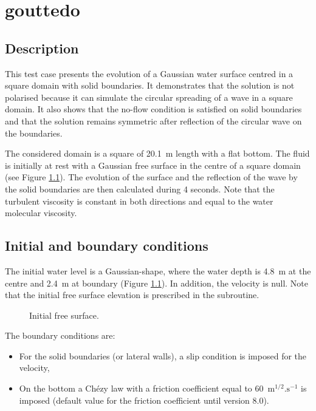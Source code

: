 \chapter{gouttedo}
\label{gouttedo}

\section{Description}
\bigskip
This test case presents the evolution of a Gaussian water surface centred in 
a square domain with solid boundaries. 
It demonstrates that the  solution is not polarised
because it can simulate the circular spreading of a wave in a square
domain.
It also shows that the no-flow condition is satisfied on solid
boundaries and that the solution remains symmetric after reflection
of the circular wave on the boundaries.

\bigskip
The considered domain is a square of 20.1~m length with a flat bottom. 
The fluid is initially at rest with a Gaussian free surface in the 
centre of a square domain (see Figure \ref{t3d:gouttedo:fig:initial}).
The evolution of the surface and the reflection of the wave by the 
solid boundaries are then calculated during 4 seconds.
Note that the turbulent viscosity is constant in both directions 
and equal to the water molecular viscosity.

%

\section{Initial and boundary conditions}
\bigskip
The initial water level is a Gaussian-shape, where the water 
depth is 4.8~m at the centre and 2.4~m at boundary 
(Figure \ref{t3d:gouttedo:fig:initial}). In addition, the velocity is null.
Note that the initial free surface elevation is prescribed in 
the  subroutine.

\begin{figure}[!htbp]
\centering
\caption{Initial free surface.}
 \label{t3d:gouttedo:fig:initial}
\end{figure}

\bigskip
The boundary conditions are:
\begin{itemize}
\item For the solid boundaries (or lateral walls), a slip condition is
imposed for the velocity,
\item On the bottom a Chézy law with a friction coefficient equal to 
60~$\text{m}^{1/2}.\text{s}^{-1}$ is imposed (default value
for the friction coefficient until version 8.0).
\end{itemize}
%
